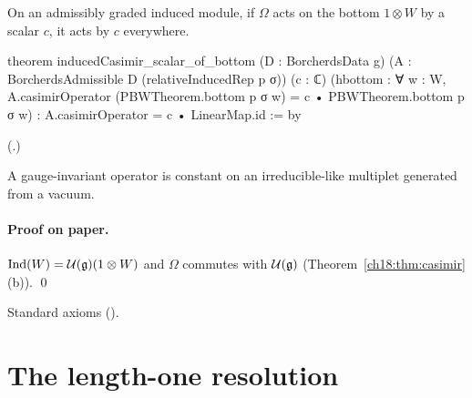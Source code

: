 \begin{theorem}\label{ch18:thm:casimirinduced}
On an admissibly graded induced module, if $\Omega$ acts on the bottom $1\otimes W$ by a scalar $c$, it acts by $c$ everywhere.
\end{theorem}
\begin{leancode}
theorem inducedCasimir_scalar_of_bottom (D : BorcherdsData g)
    (A : BorcherdsAdmissible D (relativeInducedRep p σ)) (c : ℂ)
    (hbottom : ∀ w : W,
      A.casimirOperator (PBWTheorem.bottom p σ w) = c • PBWTheorem.bottom p σ w) :
    A.casimirOperator = c • LinearMap.id := by
\end{leancode}
(.)
\begin{physics}A gauge-invariant operator is constant on an irreducible-like multiplet generated from a vacuum.\end{physics}
\paragraph{Proof on paper.}  $\mathrm{Ind}(W)=\mathcal U(\mathfrak{g})(1\otimes W)$ and $\Omega$ commutes with $\mathcal U(\mathfrak{g})$ (Theorem~\ref{ch18:thm:casimir}(b)). \qed
\begin{status}Standard axioms ().\end{status}

\section{The length-one resolution}\label{ch18:sec:resolution}


